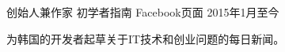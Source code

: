 

\begin{cventries}

  \cventry
    {创始人兼作家} %
    {初学者指南} %
    {Facebook页面} %
    {2015年1月至今} %
    {
      \begin{cvitems} %
        \item {为韩国的开发者起草关于IT技术和创业问题的每日新闻。}
      \end{cvitems}
    }

\end{cventries}

